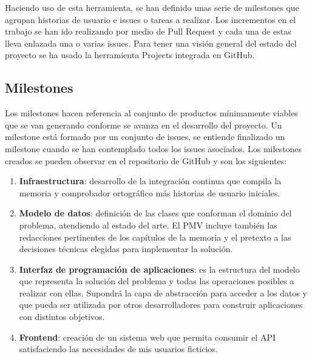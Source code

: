 Haciendo uso de esta herramienta, se han definido unas serie de milestones que agrupan historias de usuario e issues o tareas a realizar. Los
incrementos en el trabajo se han ido realizando por medio de Pull Request y cada una de estas lleva enlazada una o varias
issues. Para tener una visión general del estado del proyecto se ha usado la herramienta Projects integrada en GitHub.

\subsection{Milestones}
Los milestones hacen referencia al conjunto de productos mínimamente viables que se van generando conforme se avanza en el
desarrollo del proyecto. Un milestone está formado por un conjunto de issues, se entiende finalizado un milestone cuando se
han contemplado todos los issues asociados.
Los milestones creados se pueden observar en el repositorio de GitHub y son los siguientes:
\begin{enumerate}
    \item \textbf{Infraestructura}: desarrollo de la integración continua que compila la memoria y comprobador ortográfico más
    historias de usuario iniciales.
    \item \textbf{Modelo de datos}: definición de las clases que conforman el dominio del problema, atendiendo al estado
    del arte. El PMV incluye también las redacciones pertinentes de los capítulos de la memoria y el pretexto a las decisiones
    técnicas elegidas para implementar la solución.
    \item \textbf{Interfaz de programación de aplicaciones}: es la estructura del modelo que representa la solución del problema
    y todas las operaciones posibles a realizar con ellas. Supondrá la capa de abstracción para acceder a los datos y que pueda
    ser utilizada por otros desarrolladores para construir aplicaciones con distintos objetivos.
    \item \textbf{Frontend}: creación de un sistema web que permita consumir el API satisfaciendo las necesidades de mis usuarios ficticios.
\end{enumerate}

